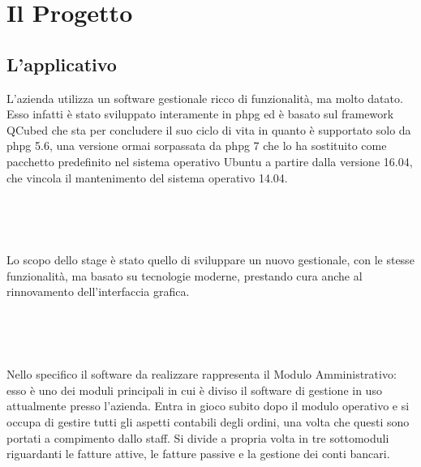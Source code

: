 
\chapter{Il Progetto}
\label{cap:progetto}


\section{L'applicativo}
	L’azienda utilizza un software gestionale ricco di funzionalità, ma molto datato.
	Esso infatti è stato sviluppato interamente in \gls{phpg}\cite{site:php} ed è basato sul framework QCubed\cite{site:QCubed} che
	sta per concludere il suo ciclo di vita in quanto è supportato solo da \gls{phpg} 5.6, una 
	versione ormai sorpassata da \gls{phpg} 7 che lo ha sostituito come pacchetto predefinito nel sistema operativo Ubuntu
	a partire dalla versione 16.04, che vincola il mantenimento del sistema operativo 14.04.
	\paragraph{\\ \\}
	Lo scopo dello stage è stato quello di sviluppare un nuovo gestionale, con le stesse
	funzionalità, ma basato su tecnologie moderne, prestando cura anche al rinnovamento
	dell’interfaccia grafica. 
	\paragraph{\\ \\}
	Nello specifico il software da realizzare  rappresenta il Modulo Amministrativo: esso è uno dei moduli principali in cui è diviso il
	software di gestione in uso attualmente presso l’azienda. Entra in gioco subito dopo il modulo operativo
	e si occupa di gestire tutti gli aspetti contabili degli ordini, una volta che questi sono portati a compimento
	dallo staff. Si divide a propria volta in tre sottomoduli riguardanti le fatture attive, le fatture passive e la
	gestione dei conti bancari.
	

